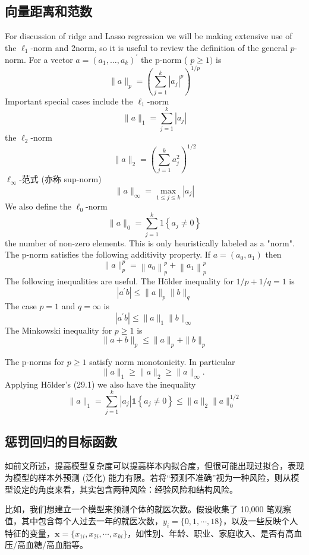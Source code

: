 \subsection{向量距离和范数}%
For discussion of ridge and Lasso regression we will be making extensive use of the $\ell_{1}$-norm and 2norm, so it is useful to review the definition of the general $p$-norm. For a vector $a=\left(a_{1}, \ldots, a_{k}\right)^{\prime}$ the p-norm ( $p \geq 1)$ is
$$
\|a\|_{p}=\left(\sum_{j=1}^{k}\left|a_{j}\right|^{p}\right)^{1 / p}
$$
Important special cases include the $\ell_{1}$-norm
$$
\|a\|_{1}=\sum_{j=1}^{k}\left|a_{j}\right|
$$
the $\ell_{2}$-norm
$$
\|a\|_{2}=\left(\sum_{j=1}^{k} a_{j}^{2}\right)^{1 / 2}
$$
$\ell_{\infty}$-范式 (亦称 sup-norm) 
$$
\|a\|_{\infty}=\max _{1 \leq j \leq k}\left|a_{j}\right|
$$
We also define the $\ell_{0}$-norm
$$
\|a\|_{0}=\sum_{j=1}^{k} \mathrm{1}\left\{a_{j} \neq 0\right\}
$$
the number of non-zero elements. This is only heuristically labeled as a "norm".
The $\mathrm{p}$-norm satisfies the following additivity property. If $a=\left(a_{0}, a_{1}\right)$ then
$$
\|a\|_{p}^{p}=\left\|a_{0}\right\|_{p}^{p}+\left\|a_{1}\right\|_{p}^{p}
$$
The following inequalities are useful. The Hölder inequality for $1 / p+1 / q=1$ is
$$
\left|a^{\prime} b\right| \leq\|a\|_{p}\|b\|_{q}
$$
The case $p=1$ and $q=\infty$ is
$$
\left|a^{\prime} b\right| \leq\|a\|_{1}\|b\|_{\infty}
$$
The Minkowski inequality for $p \geq 1$ is
$$
\|a+b\|_{p} \leq\|a\|_{p}+\|b\|_{p}
$$

The p-norms for $p \geq 1$ satisfy norm monotonicity. In particular
$$
\|a\|_{1} \geq\|a\|_{2} \geq\|a\|_{\infty} \text {. }
$$
Applying Hölder's (29.1) we also have the inequality
$$
\|a\|_{1}=\sum_{j=1}^{k}\left|a_{j}\right| \mathbf{1}\left\{a_{j} \neq 0\right\} \leq\|a\|_{2}\|a\|_{0}^{1 / 2}
$$
\fi


\subsection{惩罚回归的目标函数}\label{sec:Lasso-goal-function}

如前文所述，提高模型复杂度可以提高样本内拟合度，但很可能出现过拟合，表现为模型的样本外预测 (泛化) 能力有限。若将“预测不准确”视为一种风险，则从模型设定的角度来看，其实包含两种风险：经验风险和结构风险。

比如，我们想建立一个模型来预测个体的就医次数。假设收集了 10,000 笔观察值，其中包含每个人过去一年的就医次数，$y_i = \{0,1,\cdots,18\}$，以及一些反映个人特征的变量，$\mathbf{x} = \{x_{1i},x_{2i},\cdots,x_{ki}\}$，如性别、年龄、职业、家庭收入、是否有高血压/高血糖/高血脂等。

